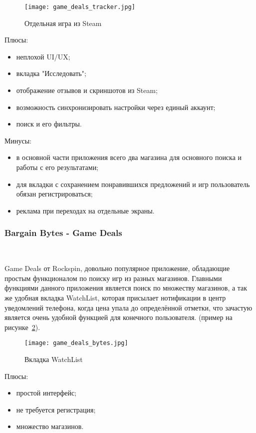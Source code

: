 \begin{figure}[H]
 \centering
   \texttt{[image: game\_deals\_tracker.jpg]} 
   \caption{Отдельная игра из Steam}
   \label{fig:domain:game_deals_tracker}
\end{figure}
 
Плюсы:
\begin{itemize}
 \item неплохой UI/UX;
 \item вкладка "Исследовать";
 \item отображение отзывов и скриншотов из Steam;
 \item возможность синхронизировать настройки через единый аккаунт;
 \item поиск и его фильтры.
\end{itemize}
 
Минусы:
\begin{itemize}
 \item в основной части приложения всего два магазина для основного поиска и работы с его результатами;
 \item для вкладки с сохранением понравившихся предложений и игр пользователь обязан регистрироваться;
 \item реклама при переходах на отдельные экраны.
\end{itemize}
 
\subsubsection{Bargain Bytes - Game Deals}~\par
Game Deals от Rockspin, довольно популярное приложение, обладающие простым функционалом по поиску игр из разных магазинов. Главными функциями данного приложения является поиск по множеству магазинов, а так же удобная вкладка WatchList, которая присылает нотификации в центр уведомлений телефона, когда цена упала до определённой отметки, что зачастую является очень удобной функцией для конечного пользователя. (пример на рисунке~\ref{fig:domain:game_deals_bytes}).
 
\begin{figure}[H]
 \centering
   \texttt{[image: game\_deals\_bytes.jpg]} 
   \caption{Вкладка WatchList}
   \label{fig:domain:game_deals_bytes}
\end{figure}
 
Плюсы:
\begin{itemize}
 \item простой интерфейс;
 \item не требуется регистрация;
 \item множество магазинов.
\end{itemize}
 
